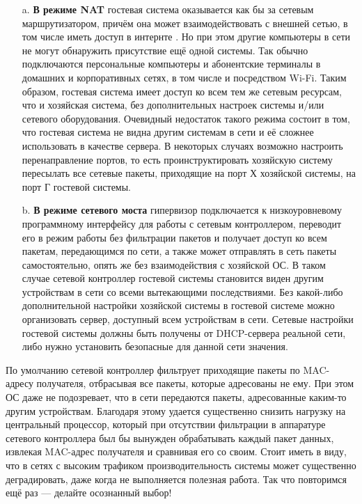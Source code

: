 \documentclass[14pt, a4paper]{article}
\begin{document}
\begin{enumerate}
\begin{enumerate}
    \item[a.] \textbf{В режиме NAT} гостевая система оказывается как бы за сетевым маршрутизатором,
    причём она может взаимодействовать с внешней сетью, в том числе иметь доступ в
    интернте . Но при этом другие компьютеры в сети не могут обнаружить присутствие
    ещё одной системы. Так обычно подключаются персональные компьютеры и
    абонентские терминалы в домашних и корпоративных сетях, в том числе и
    посредством Wi-Fi. Таким образом, гостевая система имеет доступ ко всем тем же
    сетевым ресурсам, что и хозяйская система, без дополнительных настроек системы
    и/или сетевого оборудования. Очевидный недостаток такого режима состоит в том, что
    гостевая система не видна другим системам в сети и её сложнее использовать в
    качестве сервера. В некоторых случаях возможно настроить перенаправление портов,
    то есть проинструктировать хозяйскую систему пересылать все сетевые пакеты,
    приходящие на порт Х хозяйской системы, на порт Г гостевой системы.
    \item[b.] \textbf{В режиме сетевого моста} гипервизор подключается к низкоуровневому
    программному интерфейсу для работы с сетевым контроллером, переводит его в
    режим работы без фильтрации пакетов и получает доступ ко всем пакетам,
    передающимся по сети, а также может отправлять в сеть пакеты самостоятельно,
    опять же без взаимодействия с хозяйской ОС. В таком случае сетевой контроллер
    гостевой системы становится виден другим устройствам в сети со всеми вытекающими
    последствиями. Без какой-либо дополнительной настройки хозяйской системы в
    гостевой системе можно организовать сервер, доступный всем устройствам в сети. Сетевые настройки гостевой системы должны быть получены от DHCP-сервера
    реальной сети, либо нужно установить безопасные для данной сети значения.
\end{enumerate}
По умолчанию сетевой контроллер фильтрует приходящие пакеты по MAC-адресу получателя,
отбрасывая все пакеты, которые адресованы не ему. При этом ОС даже не подозревает, что в
сети передаются пакеты, адресованные каким-то другим устройствам. Благодаря этому
удается существенно снизить нагрузку на центральный процессор, который при отсутствии
фильтрации в аппаратуре сетевого контроллера был бы вынужден обрабатывать каждый
пакет данных, извлекая MAC-адрес получателя и сравнивая его со своим. Стоит иметь в виду,
что в сетях с высоким трафиком производительность системы может существенно
деградировать, даже когда не выполняется полезная работа. Так что повторимся ещё раз —
делайте осознанный выбор!
\end{enumerate}
\end{document}
